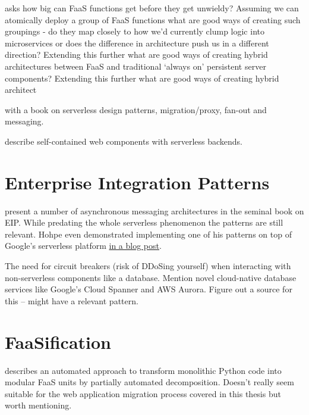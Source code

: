 \textcite{robert2016serverlessarchitectures} asks how big can FaaS functions get before they get unwieldy? Assuming we can atomically deploy a group of FaaS functions what are good ways of creating such groupings - do they map closely to how we’d currently clump logic into microservices or does the difference in architecture push us in a different direction? Extending this further what are good ways of creating hybrid architectures between FaaS and traditional ‘always on’ persistent server components? Extending this further what are good ways of creating hybrid architect

\textcite{zambrano18patterns} with a book on serverless design patterns, migration/proxy, fan-out and messaging.

\textcite{ast17webcomponent} describe self-contained web components with serverless backends.

\section{Enterprise Integration Patterns}

\textcite{hohpe2004enterprise} present a number of asynchronous messaging architectures in the seminal book on EIP. While predating the whole serverless phenomenon the patterns are still relevant. Hohpe even demonstrated implementing one of his patterns on top of Google's serverless platform \href{http://www.enterpriseintegrationpatterns.com/ramblings/google_cloud_functions.html}{in a blog post}.

The need for circuit breakers (risk of DDoSing yourself) when interacting with non-serverless components like a database. Mention novel cloud-native database services like Google's Cloud Spanner and AWS Aurora. Figure out a source for this -- \textcite{hohpe2004enterprise} might have a relevant pattern.

\section{FaaSification}

\textcite{spillner17transformpython} describes an automated approach to transform monolithic Python code into modular FaaS units by partially automated decomposition. Doesn't really seem suitable for the web application migration process covered in this thesis but worth mentioning.
